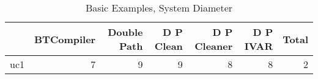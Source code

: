 \begin{table}
\centering
\caption{Basic Examples, System Diameter}
\label{b_e_diam}
\begin{tabular}{lrrrrrr}
\toprule
{} &  BTCompiler &  Double Path &  D P Clean &  D P Cleaner &  D P IVAR &  Total \\
\midrule
uc1 &           7 &            9 &          9 &            8 &         8 &      2 \\
\bottomrule
\end{tabular}
\end{table}
